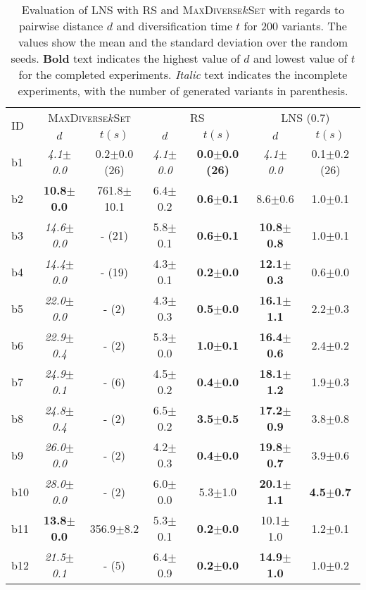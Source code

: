 \begin{longtable}{|l|c|c|c|c|c|c|}
\caption{\label{tab:dist_max_rs_lns} Evaluation of \ac{LNS} with \ac{RS} and \textsc{MaxDiverse$k$Set}
		with regards to pairwise distance $d$ and diversification time $t$ for 200 variants. The values
		show the mean and the standard deviation over the random seeds.
		\textbf{Bold} text indicates the highest value of $d$ and lowest value of $t$
		for the completed experiments. 
		\textit{Italic} text indicates the incomplete experiments, 
		with the number of generated variants in parenthesis.}\\
\hline
\multirow{2}{*}{ID}&\multicolumn{2}{c|}{\textsc{MaxDiverse$k$Set}}&\multicolumn{2}{c|}{{RS}}&\multicolumn{2}{c|}{LNS (0.7)}\\
\cline{2-7}
&$d$&$t(s)$&$d$&$t(s)$&$d$&$t(s)$\\
\hline
b1&\textit{4.1$\pm$0.0} & 0.2$\pm$0.0 (26)&\textit{4.1$\pm$0.0} & \textbf{0.0$\pm$0.0 (26)}&\textit{4.1$\pm$0.0} & 0.1$\pm$0.2 (26)
\\
b2&\textbf{10.8$\pm$0.0} & 761.8$\pm$10.1&6.4$\pm$0.2 & \textbf{0.6$\pm$0.1}&8.6$\pm$0.6 & 1.0$\pm$0.1
\\
b3&\textit{14.6$\pm$0.0} & - (21)&5.8$\pm$0.1 & \textbf{0.6$\pm$0.1}&\textbf{10.8$\pm$0.8} & 1.0$\pm$0.1
\\
b4&\textit{14.4$\pm$0.0} & - (19)&4.3$\pm$0.1 & \textbf{0.2$\pm$0.0}&\textbf{12.1$\pm$0.3} & 0.6$\pm$0.0
\\
b5&\textit{22.0$\pm$0.0} & - (2)&4.3$\pm$0.3 & \textbf{0.5$\pm$0.0}&\textbf{16.1$\pm$1.1} & 2.2$\pm$0.3
\\
b6&\textit{22.9$\pm$0.4} & - (2)&5.3$\pm$0.0 & \textbf{1.0$\pm$0.1}&\textbf{16.4$\pm$0.6} & 2.4$\pm$0.2
\\
b7&\textit{24.9$\pm$0.1} & - (6)&4.5$\pm$0.2 & \textbf{0.4$\pm$0.0}&\textbf{18.1$\pm$1.2} & 1.9$\pm$0.3
\\
b8&\textit{24.8$\pm$0.4} & - (2)&6.5$\pm$0.2 & \textbf{3.5$\pm$0.5}&\textbf{17.2$\pm$0.9} & 3.8$\pm$0.8
\\
b9&\textit{26.0$\pm$0.0} & - (2)&4.2$\pm$0.3 & \textbf{0.4$\pm$0.0}&\textbf{19.8$\pm$0.7} & 3.9$\pm$0.6
\\
b10&\textit{28.0$\pm$0.0} & - (2)&6.0$\pm$0.0 & 5.3$\pm$1.0&\textbf{20.1$\pm$1.1} & \textbf{4.5$\pm$0.7}
\\
b11&\textbf{13.8$\pm$0.0} & 356.9$\pm$8.2&5.3$\pm$0.1 & \textbf{0.2$\pm$0.0}&10.1$\pm$1.0 & 1.2$\pm$0.1
\\
b12&\textit{21.5$\pm$0.1} & - (5)&6.4$\pm$0.9 & \textbf{0.2$\pm$0.0}&\textbf{14.9$\pm$1.0} & 1.0$\pm$0.2

\end{longtable}
